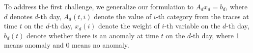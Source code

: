 %

To address the first challenge, we generalize our formulation to $A_d
x_d = b_d$, where $d$ denotes $d$-th day, $A_d(t,i)$ denote the value
of $i$-th category from the traces at time $t$ on the $d$-th day,
$x_d(i)$ denote the weight of $i$-th variable on the $d$-th day, $b_d(t)$
denote whether there is an anomaly at time $t$ on the $d$-th day,
where 1 means anomaly and 0 means no anomaly.

